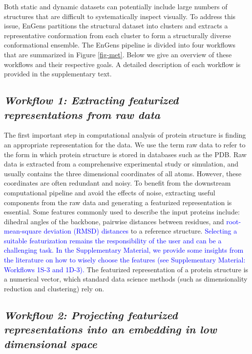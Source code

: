 \documentclass[unnumsec,webpdf,contemporary,large,numsquare]{oup-authoring-template}%
\theoremstyle{thmstyleone}%
\theoremstyle{thmstyletwo}%
\theoremstyle{thmstylethree}%
\begin{document}
Both static and dynamic datasets can potentially include large numbers of structures that are difficult to systematically inspect visually. To address this issue, EnGens partitions the structural dataset into clusters and extracts a representative conformation from each cluster to form a structurally diverse conformational ensemble. The EnGens pipeline is divided into four workflows that are summarized in Figure \ref{fig-met}. Below we give an overview of these workflows and their respective goals. A detailed description of each workflow is provided in the supplementary text. 


\subsection{\textit{\textbf{Workflow 1:} Extracting featurized representations from raw data}}\label{wf1}

The first important step in computational analysis of protein structure is finding an appropriate representation for the data. We use the term raw data to refer to the form in which protein structure is stored in databases such as the PDB. Raw data is extracted from a comprehensive experimental study or simulation, and usually contains the three dimensional coordinates of all atoms.  However, these coordinates are often redundant and noisy. To benefit from the downstream computational pipeline and avoid the effects of noise, extracting useful components from the raw data and generating a featurized representation is essential. Some features commonly used to describe the input proteins include: dihedral angles of the backbone, pairwise distances between residues, and \textcolor{blue}{root-mean-square deviation (RMSD) distances} to a reference structure. \textcolor{blue}{Selecting a suitable featurization remains the responsibility of the user and can be a challenging task. In the Supplementary Material, we provide some insights from the literature on how to wisely choose the features (see Supplementary Material: Workflows 1S-3 and 1D-3).} The featurized representation of a protein structure is a numerical vector, which standard data science methods (such as dimensionality reduction and clustering) rely on.  

\subsection{\textit{\textbf{Workflow 2:} Projecting featurized representations into an embedding in low dimensional space}}\label{wf1}
\end{document}
